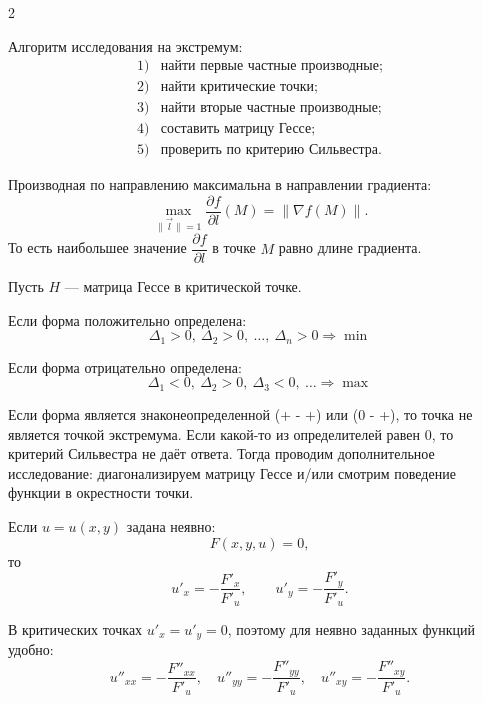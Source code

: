 \begin{multicols}{2}
\begin{remark}
    Алгоритм исследования на экстремум:
    \[
    \begin{array}{ll}
        1) & \text{найти первые частные производные;} \\
        2) & \text{найти критические точки;} \\
        3) & \text{найти вторые частные производные;} \\
        4) & \text{составить матрицу Гессе;} \\
        5) & \text{проверить по критерию Сильвестра.}
    \end{array}
    \]
\end{remark}

\begin{remark}
    Производная по направлению максимальна в направлении градиента:
    \[
        \max_{\|\vec l\|=1}
        \frac{\partial f}{\partial l}(M)
        =
        \|\nabla f(M)\|.
    \]
    То есть наибольшее значение $\dfrac{\partial f}{\partial l}$ в точке $M$ равно длине градиента.
\end{remark}

\begin{theorem}
    Пусть $H$ --- матрица Гессе в критической точке.

    Если форма положительно определена:
    \[
        \Delta_1 > 0,\ \Delta_2 > 0,\ \ldots,\ \Delta_n > 0
        \Rightarrow \min
    \]

    Если форма отрицательно определена:
    \[
        \Delta_1 < 0,\ \Delta_2 > 0,\ \Delta_3 < 0,\ \ldots
        \Rightarrow \max
    \]

    Если форма является знаконеопределенной (+ - +) или (0 - +), то точка не является точкой экстремума. Если какой-то из определителей равен 0, то критерий Сильвестра не даёт ответа. Тогда проводим дополнительное исследование: диагонализируем матрицу Гессе и/или смотрим поведение функции в окрестности точки.
\end{theorem}

\begin{definition}
    Если $u = u(x,y)$ задана неявно:
    \[
        F(x,y,u) = 0,
    \]
    то
    \[
        u'_x = -\frac{F'_x}{F'_u},
        \qquad
        u'_y = -\frac{F'_y}{F'_u}.
    \]
\end{definition}

\begin{remark}
    В критических точках $u'_x = u'_y = 0$, поэтому для неявно заданных функций удобно:
    \[
        u''_{xx} = -\frac{F''_{xx}}{F'_u},\quad
        u''_{yy} = -\frac{F''_{yy}}{F'_u},\quad
        u''_{xy} = -\frac{F''_{xy}}{F'_u}.
    \]
\end{remark}

\end{multicols}




